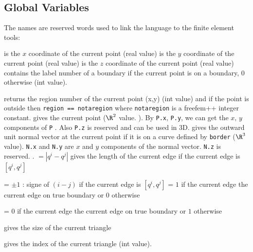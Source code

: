 \documentclass[a4paper,twoside,12pt]{book}
\begin{document}
\subsection{Global Variables}\label{sec:Global}
 The names  are reserved words used to link
the language to the finite element tools:
\begin{description}
    \itemtt[x]  is the $x$ coordinate of the current point (real value) 
    \itemtt[y]  is the $y$ coordinate  of the current point (real value) 
    \itemtt[z]  is the $z$ coordinate of the current point (real value) 
\itemtt[label] contains the label number of a boundary if the  current point is
on a boundary, 0 otherwise  (int value). 
    \item[region]   returns the region number of  the current point (x,y) (int value) 
    and if the point is outside then  \texttt{region == notaregion} where \texttt{notaregion} is a freefem++ integer constant.
      
\itemtt[P]  gives the  current point  ($\R^{2}$ value. ).
By \texttt{P.x}, \texttt{P.y}, we can get the $x,\, y$ components of \texttt{P} .
Also \texttt{P.z} is reserved and can be used in 3D.
    \itemtt[N]  gives the outward unit normal vector at the  current point if it is on a
     curve defined by \texttt{border} ($\R^{3}$ value).
\texttt{N.x} and \texttt{N.y} are $x$ and $y$ components of the normal vector.
\texttt{N.z} is reserved. .
    \itemtt[lenEdge] $= |q^i-q^j|$ gives the length of the current edge
    {if the current edge is }$ [q^i,q^j]$
    

    \itemtt[edgeOrientation] = $\pm 1$  : signe of $(i-j)$  if the current edge is  $[q^i,q^j]$
    \itemtt[BoundaryEdge]  = $1$ if the current edge the current edge on true  boundary or $0$ otherwise

    \itemtt[InternalEdge] =   $0$ if the current edge the current edge on true  boundary or $1$ otherwise
 
    
    \itemtt[hTriangle] gives the size of the current triangle 

    \itemtt[nuTriangle] gives the index of the current triangle (int value).


\end{description}
\end{document}
